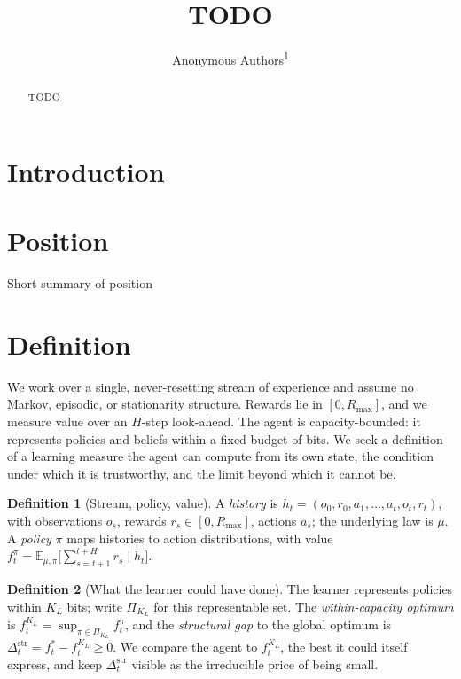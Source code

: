 \documentclass[10pt]{article} %
\title{TODO}
\author{Anonymous Authors\textsuperscript{1}}
\theoremstyle{definition}
\newtheorem{definition}{Definition}
\theoremstyle{plain}
\newcommand{\Ex}{\mathbb{E}}
\newcommand{\PiK}{\Pi_{K_L}}
\newcommand{\Rmax}{R_{\max}}
\newcommand{\Dstruct}{\Delta^{\mathrm{str}}}
\begin{document}
\makeCover
\maketitle

\begin{abstract}
TODO
\end{abstract}

\section{Introduction}
\label{sec:intro}

\section{Position}

Short summary of position

\section{Definition}
\label{sec:defs}


We work over a single, never-resetting stream of experience and assume no Markov, episodic, or stationarity structure. Rewards lie in $[0,\Rmax]$, and we measure value over an $H$-step look-ahead. The agent is capacity-bounded: it represents policies and beliefs within a fixed budget of bits. We seek a definition of a learning measure the agent can compute from its own state, the condition under which it is trustworthy, and the limit beyond which it cannot be.

\begin{definition}[Stream, policy, value]
\label{def:basic}
A \emph{history} is $h_t = (o_0,r_0,a_1,\dots,a_t,o_t,r_t)$, with observations $o_s$, rewards $r_s \in [0,\Rmax]$, actions $a_s$; the underlying law is $\mu$. A \emph{policy} $\pi$ maps histories to action distributions, with value $f^{\pi}_t = \Ex_{\mu,\pi}\!\big[\sum_{s=t+1}^{t+H} r_s \mid h_t\big]$.
\end{definition}

\begin{definition}[What the learner could have done]
\label{def:capcomp}
The learner represents policies within $K_L$ bits; write $\PiK$ for this representable set. The \emph{within-capacity optimum} is $f^{K_L}_t = \sup_{\pi \in \PiK} f^{\pi}_t$, and the \emph{structural gap} to the global optimum is $\Dstruct_t = f^{*}_t - f^{K_L}_t \ge 0$. We compare the agent to $f^{K_L}_t$, the best it could itself express, and keep $\Dstruct_t$ visible as the irreducible price of being small.
\end{definition}
\end{document}
